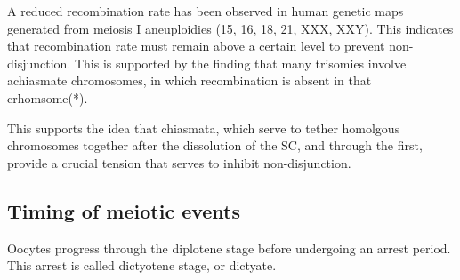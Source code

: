 A reduced recombination rate has been observed in human genetic maps generated from meiosis I aneuploidies (15, 16, 18, 21, XXX, XXY)\cite{Hassold2001,Lynn2004}.
This indicates that recombination rate must remain above a certain level to prevent non-disjunction.
This is supported by the finding that many trisomies involve achiasmate chromosomes, in which recombination is absent in that crhomsome(*).

This supports the idea that chiasmata, which serve to tether homolgous chromosomes together after the dissolution of the SC, and through the first, provide a crucial tension that serves to inhibit non-disjunction.






\subsection{Timing of meiotic events}

Oocytes progress through the diplotene stage before undergoing an arrest period.
This arrest is called dictyotene stage, or dictyate.





